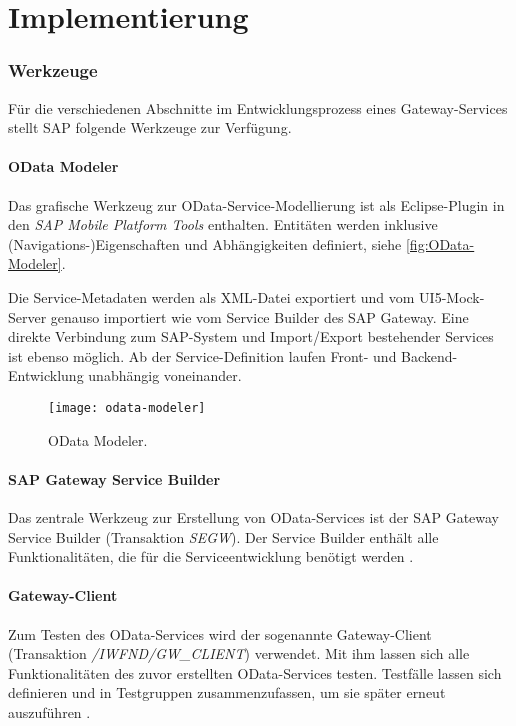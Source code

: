 \chapter{Implementierung}
\label{cha:Implementierung}
\subsection{Werkzeuge}

Für die verschiedenen Abschnitte im Entwicklungsprozess eines Gateway-Services stellt SAP folgende Werkzeuge zur Verfügung.

\subsubsection{OData Modeler}
\label{sec:OData-Modeler}
Das grafische Werkzeug zur OData-Service-Modellierung ist als Eclipse-Plugin in den \textit{SAP Mobile Platform Tools} enthalten. Entitäten werden inklusive (Navigations-)Eigenschaften und Abhängigkeiten definiert, siehe \autoref{fig:OData-Modeler}.

Die Service-Metadaten werden als XML-Datei exportiert und vom UI5-Mock-Server genauso importiert wie vom Service Builder des SAP Gateway. Eine direkte Verbindung zum SAP-System und Import/Export bestehender Services ist ebenso möglich. Ab der Service-Definition laufen Front- und Backend-Entwicklung unabhängig voneinander.

\begin{figure}[h]
	\centering
	\texttt{[image: odata-modeler]} 
	\caption[OData Modeler]{OData Modeler.}
	\label{fig:OData-Modeler}
\end{figure}

\subsubsection{SAP Gateway Service Builder}
Das zentrale Werkzeug zur Erstellung von OData-Services ist der SAP Gateway Service Builder (Transaktion \emph{SEGW}). Der Service Builder enthält alle Funktionalitäten, die für die Serviceentwicklung benötigt werden \cite[S.\ 187-189]{BoennenDreesFischerHeinzStrothmann2014}. 


\subsubsection{Gateway-Client}
\label{sec:gateway-client}
Zum Testen des OData-Services wird der sogenannte Gateway-Client (Transaktion \emph{/IWFND/GW\_CLIENT}) verwendet. Mit ihm lassen sich alle Funktionalitäten des zuvor erstellten OData-Services testen. Testfälle lassen sich definieren und in Testgruppen zusammenzufassen, um sie später erneut auszuführen \cite[S.\ 190-192]{BoennenDreesFischerHeinzStrothmann2014}.


